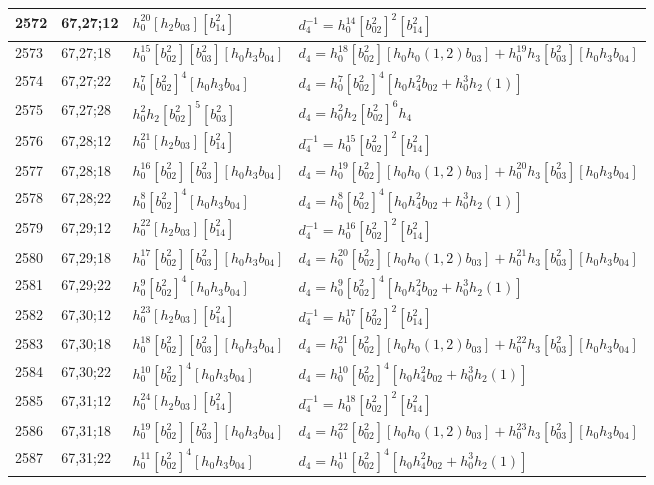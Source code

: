 \documentclass{article}
\begin{document}
\begin{longtable}{|l|l|>{\raggedright\arraybackslash}p{6cm}|>{\raggedright\arraybackslash}p{6cm}|}
\hline
2572 & 67,27;12 & $h_0^{20}[h_2b_{03}][b_{14}^2]$ & $d_{4}^{-1}=h_0^{14}[b_{02}^2]^2[b_{14}^2]$\\
\hline
2573 & 67,27;18 & $h_0^{15}[b_{02}^2][b_{03}^2][h_0h_3b_{04}]$ &$d_{4}=h_0^{18}[b_{02}^2][h_0h_0(1, 2)b_{03}] + h_0^{19}h_3[b_{03}^2][h_0h_3b_{04}]$\\
\hline
2574 & 67,27;22 & $h_0^7[b_{02}^2]^4[h_0h_3b_{04}]$ &$d_{4}=h_0^7[b_{02}^2]^4[h_0h_4^2b_{02} + h_0^3h_2(1)]$\\
\hline
2575 & 67,27;28 & $h_0^2h_2[b_{02}^2]^5[b_{03}^2]$ &$d_{4}=h_0^2h_2[b_{02}^2]^6h_4$\\
\hline
2576 & 67,28;12 & $h_0^{21}[h_2b_{03}][b_{14}^2]$ & $d_{4}^{-1}=h_0^{15}[b_{02}^2]^2[b_{14}^2]$\\
\hline
2577 & 67,28;18 & $h_0^{16}[b_{02}^2][b_{03}^2][h_0h_3b_{04}]$ &$d_{4}=h_0^{19}[b_{02}^2][h_0h_0(1, 2)b_{03}] + h_0^{20}h_3[b_{03}^2][h_0h_3b_{04}]$\\
\hline
2578 & 67,28;22 & $h_0^8[b_{02}^2]^4[h_0h_3b_{04}]$ &$d_{4}=h_0^8[b_{02}^2]^4[h_0h_4^2b_{02} + h_0^3h_2(1)]$\\
\hline
2579 & 67,29;12 & $h_0^{22}[h_2b_{03}][b_{14}^2]$ & $d_{4}^{-1}=h_0^{16}[b_{02}^2]^2[b_{14}^2]$\\
\hline
2580 & 67,29;18 & $h_0^{17}[b_{02}^2][b_{03}^2][h_0h_3b_{04}]$ &$d_{4}=h_0^{20}[b_{02}^2][h_0h_0(1, 2)b_{03}] + h_0^{21}h_3[b_{03}^2][h_0h_3b_{04}]$\\
\hline
2581 & 67,29;22 & $h_0^9[b_{02}^2]^4[h_0h_3b_{04}]$ &$d_{4}=h_0^9[b_{02}^2]^4[h_0h_4^2b_{02} + h_0^3h_2(1)]$\\
\hline
2582 & 67,30;12 & $h_0^{23}[h_2b_{03}][b_{14}^2]$ & $d_{4}^{-1}=h_0^{17}[b_{02}^2]^2[b_{14}^2]$\\
\hline
2583 & 67,30;18 & $h_0^{18}[b_{02}^2][b_{03}^2][h_0h_3b_{04}]$ &$d_{4}=h_0^{21}[b_{02}^2][h_0h_0(1, 2)b_{03}] + h_0^{22}h_3[b_{03}^2][h_0h_3b_{04}]$\\
\hline
2584 & 67,30;22 & $h_0^{10}[b_{02}^2]^4[h_0h_3b_{04}]$ &$d_{4}=h_0^{10}[b_{02}^2]^4[h_0h_4^2b_{02} + h_0^3h_2(1)]$\\
\hline
2585 & 67,31;12 & $h_0^{24}[h_2b_{03}][b_{14}^2]$ & $d_{4}^{-1}=h_0^{18}[b_{02}^2]^2[b_{14}^2]$\\
\hline
2586 & 67,31;18 & $h_0^{19}[b_{02}^2][b_{03}^2][h_0h_3b_{04}]$ &$d_{4}=h_0^{22}[b_{02}^2][h_0h_0(1, 2)b_{03}] + h_0^{23}h_3[b_{03}^2][h_0h_3b_{04}]$\\
\hline
2587 & 67,31;22 & $h_0^{11}[b_{02}^2]^4[h_0h_3b_{04}]$ &$d_{4}=h_0^{11}[b_{02}^2]^4[h_0h_4^2b_{02} + h_0^3h_2(1)]$\\

\end{longtable}
\end{document}
